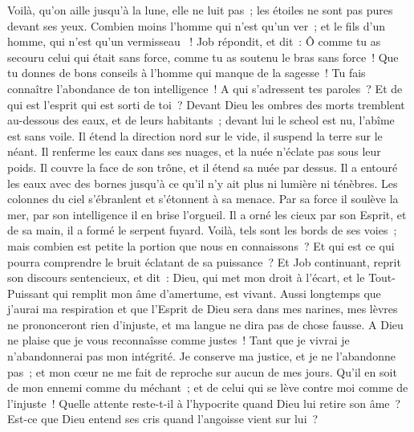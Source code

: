 \begin{multicols}{2}
Voilà, qu'on aille jusqu'à la lune, elle ne luit pas~; les étoiles ne sont pas pures devant ses yeux.
Combien moins l'homme qui n'est qu'un ver~; et le fils d'un homme, qui n'est qu'un vermisseau ~!
\VerseOne{}Job répondit, et dit~:
Ô comme tu as secouru celui qui était sans force, comme tu as soutenu le bras sans force~!
Que tu donnes de bons conseils à l'homme qui manque de la sagesse~! Tu fais connaître l'abondance de ton intelligence~!
A qui s'adressent tes paroles~? Et de qui est l'esprit qui est sorti de toi~?
Devant Dieu les ombres des morts tremblent au-dessous des eaux, et de leurs habitants~;
devant lui le scheol est nu, l'abîme est sans voile.
Il étend la direction nord sur le vide, il suspend la terre sur le néant.
Il renferme les eaux dans ses nuages, et la nuée n'éclate pas sous leur poids.
Il couvre la face de son trône, et il étend sa nuée par dessus.
Il a entouré les eaux avec des bornes jusqu'à ce qu'il n'y ait plus ni lumière ni ténèbres.
Les colonnes du ciel s'ébranlent et s'étonnent à sa menace.
Par sa force il soulève la mer, par son intelligence il en brise l'orgueil.
Il a orné les cieux par son Esprit, et de sa main, il a formé le serpent fuyard.
Voilà, tels sont les bords de ses voies~; mais combien est petite la portion que nous en connaissons~? Et qui est ce qui pourra comprendre le bruit éclatant de sa puissance~?
\VerseOne{}Et Job continuant, reprit son discours sentencieux, et dit~:
Dieu, qui met mon droit à l'écart, et le Tout-Puissant qui remplit mon âme d'amertume, est vivant.
Aussi longtemps que j'aurai ma respiration et que l'Esprit de Dieu sera dans mes narines,
mes lèvres ne prononceront rien d'injuste, et ma langue ne dira pas de chose fausse.
A Dieu ne plaise que je vous reconnaîsse comme justes~! Tant que je vivrai je n'abandonnerai pas mon intégrité.
Je conserve ma justice, et je ne l'abandonne pas~; et mon cœur ne me fait de reproche sur aucun de mes jours.
Qu'il en soit de mon ennemi comme du méchant~; et de celui qui se lève contre moi comme de l'injuste~!
Quelle attente reste-t-il à l'hypocrite quand Dieu lui retire son âme~?
Est-ce que Dieu entend ses cris quand l'angoisse vient sur lui~?

\end{multicols}
